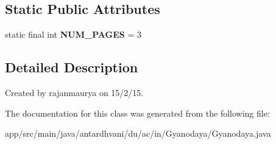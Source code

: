 \subsection*{Static Public Attributes}
\begin{DoxyCompactItemize}
\item 
\hypertarget{classantardhvani_1_1du_1_1ac_1_1in_1_1_gyanodaya_1_1_gyanodaya_a492cef34cd87dd6490cf5e0594c0800b}{}static final int {\bfseries N\+U\+M\+\_\+\+P\+A\+G\+E\+S} = 3\label{classantardhvani_1_1du_1_1ac_1_1in_1_1_gyanodaya_1_1_gyanodaya_a492cef34cd87dd6490cf5e0594c0800b}

\end{DoxyCompactItemize}


\subsection{Detailed Description}
Created by rajanmaurya on 15/2/15. 

The documentation for this class was generated from the following file\+:\begin{DoxyCompactItemize}
\item 
app/src/main/java/antardhvani/du/ac/in/\+Gyanodaya/Gyanodaya.\+java\end{DoxyCompactItemize}
